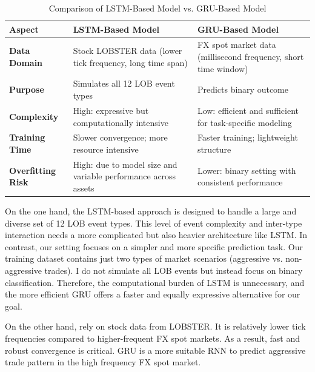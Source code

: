 \begin{table}[H]
\centering
\caption{Comparison of LSTM-Based Model vs. GRU-Based Model}
\begin{tabular}{p{3cm} p{5.5cm} p{5.5cm}}
\toprule
\textbf{Aspect} & \textbf{LSTM-Based Model} & \textbf{GRU-Based Model} \\
\midrule
\textbf{Data Domain} & Stock LOBSTER data (lower tick frequency, long time span) & FX spot market data (millisecond frequency, short time window) \\
\textbf{Purpose} & Simulates all 12 LOB event types & Predicts binary outcome \\
\textbf{Complexity} & High: expressive but computationally intensive & Low: efficient and sufficient for task-specific modeling \\
\textbf{Training Time} & Slower convergence; more resource intensive & Faster training; lightweight structure \\
\textbf{Overfitting Risk} & High: due to model size and variable performance across assets & Lower: binary setting with consistent performance \\
\bottomrule
\end{tabular}
\label{tab:gru_vs_lstm}
\end{table}

On the one hand, the LSTM-based approach is designed to handle a large and diverse set of 12 LOB event types. This level of event complexity and inter-type interaction needs a more complicated but also heavier architecture like LSTM. In contrast, our setting focuses on a simpler and more specific prediction task. Our training dataset contains just two types of market scenarios (aggressive vs. non-aggressive trades). I do not simulate all LOB events but instead focus on binary classification. Therefore, the computational burden of LSTM is unnecessary, and the more efficient GRU offers a faster and equally expressive alternative for our goal.

On the other hand, \cite{lalor2025eventbasedlimitorderbook} rely on stock data from LOBSTER. It is relatively lower tick frequencies compared to higher-frequent FX spot markets. As a result, fast and robust convergence is critical. GRU is a more suitable RNN to predict aggressive trade pattern in the high frequency FX spot market.


